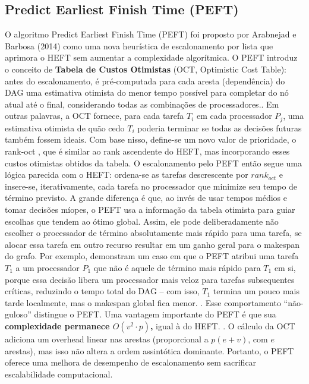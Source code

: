 \documentclass[12pt, %
openright, 
oneside, %
a4paper,    %
brazil]{facom-ufu-abntex2}
\begin{document}
\subsection{Predict Earliest Finish Time (PEFT)}
O algoritmo Predict Earliest Finish Time (PEFT) foi proposto por Arabnejad e Barbosa (2014) como uma
nova heurística de escalonamento por lista que aprimora o HEFT sem aumentar a complexidade
algorítmica\cite{arabnejad2013list}. O PEFT introduz o conceito de \textbf{Tabela de Custos Otimistas} (OCT, Optimistic Cost Table):
antes do escalonamento, é pré-computada para cada aresta (dependência) do DAG uma estimativa
otimista do menor tempo possível para completar do nó atual até o final, considerando todas as
combinações de processadores\cite{arabnejad2013list}.. Em outras palavras, a OCT fornece, para cada tarefa $T_i$ em
cada processador $P_j$, uma estimativa otimista de quão cedo $T_i$ poderia terminar se todas as
decisões futuras também fossem ideais. Com base nisso, define-se um novo valor de prioridade, o rank-oct , que é similar ao rank ascendente do HEFT, mas incorporando esses custos otimistas obtidos
da tabela\cite{arabnejad2013list}.
O escalonamento pelo PEFT então segue uma lógica parecida com o HEFT: ordena-se as tarefas
descrescente por $rank_{oct}$ e insere-se, iterativamente, cada tarefa no processador que minimize seu
tempo de término previsto. A grande diferença é que, ao invés de usar tempos médios e tomar
decisões míopes, o PEFT usa a informação da tabela otimista para guiar escolhas que tendem ao ótimo
global. Assim, ele pode deliberadamente não escolher o processador de término absolutamente mais
rápido para uma tarefa, se alocar essa tarefa em outro recurso resultar em um ganho geral para o
makespan do grafo. Por exemplo, \cite{arabnejad2013list} demonstram um caso em que o PEFT atribui uma
tarefa $T_1$ a um processador $P_1$ que não é aquele de término mais rápido para $T_1$ em si,
porque essa decisão libera um processador mais veloz para tarefas subsequentes críticas, reduzindo o
tempo total do DAG – com isso, $T_1$ termina um pouco mais tarde localmente, mas o makespan
global fica menor\cite{arabnejad2013list}. . Esse comportamento “não-guloso” distingue o PEFT.
Uma vantagem importante do PEFT é que sua \textbf{complexidade permanece $O(v^2 \cdot p)$,} igual à do
HEFT\cite{arabnejad2013list}. . O cálculo da OCT adiciona um overhead linear nas arestas (proporcional a $p(e+v)$, com $e$
arestas)\cite{arabnejad2013list}, mas isso não altera a ordem assintótica dominante. Portanto, o PEFT oferece uma melhora
de desempenho de escalonamento sem sacrificar escalabilidade computacional.
\end{document}
